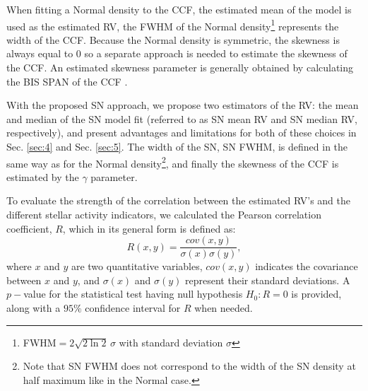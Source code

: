 \documentclass{aa}
\begin{document}

When fitting a Normal density to the CCF, the estimated mean of the model is used as the estimated RV, the FWHM of the Normal density\footnote{FWHM$=2\sqrt{2\ln2}\,\sigma$ with standard deviation $\sigma$} represents the width of the CCF.
Because the Normal density is symmetric, the skewness is always equal to 0 so a separate approach is needed to estimate the skewness of the CCF.
An estimated skewness parameter is generally obtained by calculating the BIS SPAN of the CCF \citep[see Sect. \ref{intro}, and e.g.][]{Queloz-2001}. 
%

With the proposed SN approach, we propose two estimators of the RV: the mean and median of the SN model fit (referred to as SN mean RV and SN median RV, respectively), and present advantages and limitations for both of these choices in Sec. \ref{sec:4} and Sec. \ref{sec:5}. 
The width of the SN, SN FWHM, is defined in the same way as for the Normal density\footnote{Note that SN FWHM does not correspond to the width of the SN density at half maximum like in the Normal case.}, and finally the skewness of the CCF is estimated by the $\gamma$ parameter.

To evaluate the strength of the correlation between the estimated RV's and the different stellar activity indicators, we calculated the Pearson correlation coefficient, $R$, which in its general form is defined as:
%
\begin{equation}
R (x,y)= \frac{cov(x,y)}{\sigma(x)\sigma(y)},
\label{eq:Pearson:corr}
\end{equation}
%
where $x$ and $y$ are two quantitative variables, $cov(x,y)$ indicates the covariance between $x$ and $y$, and $\sigma(x)$ and $\sigma(y)$ represent their standard deviations.  A $p-$value for the statistical test having null hypothesis $H_{0}: R=0$ is provided, along with a $95\%$ confidence interval for $R$ when needed.
\end{document}
